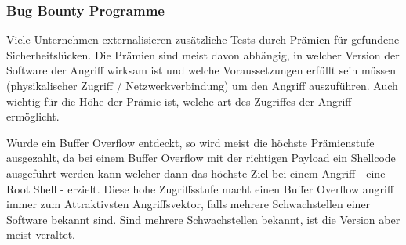 \subsubsection{Bug Bounty Programme} \label{sec:bounties}
Viele Unternehmen externalisieren zusätzliche Tests durch Prämien für gefundene Sicherheitslücken.
Die Prämien sind meist davon abhängig, in welcher Version der Software der Angriff 
wirksam ist und welche Voraussetzungen erfüllt sein müssen (physikalischer Zugriff / Netzwerkverbindung)
um den Angriff auszuführen. Auch wichtig für die Höhe der Prämie ist, welche art des Zugriffes
der Angriff ermöglicht.

Wurde ein Buffer Overflow entdeckt, so wird meist die höchste Prämienstufe ausgezahlt, da bei einem
Buffer Overflow mit der richtigen Payload ein Shellcode ausgeführt werden kann welcher dann das
höchste Ziel bei einem Angriff - eine Root Shell - erzielt.
Diese hohe Zugriffsstufe macht einen Buffer Overflow angriff immer zum Attraktivsten Angriffsvektor,
falls mehrere Schwachstellen einer Software bekannt sind. Sind mehrere Schwachstellen bekannt, ist die
Version aber meist veraltet. 




